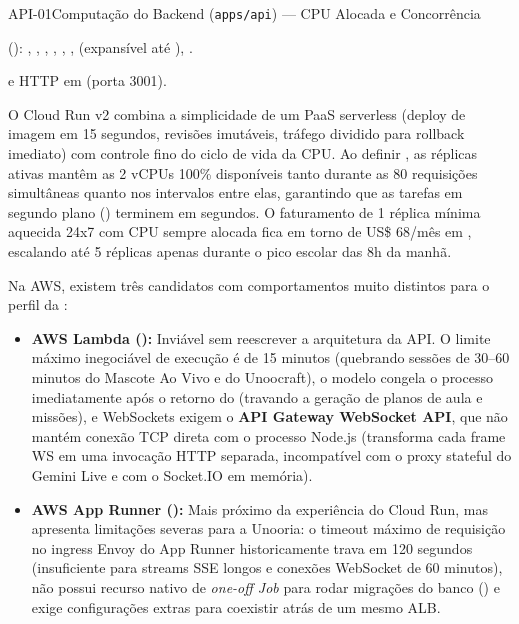 \begin{pecaarq}{API-01}{Computação do Backend (\texttt{apps/api}) --- CPU Alocada e Concorrência}{\sgcp~\nativo\enspace\saws~\equivalente\enspace\sazure~\nativo}
\begin{campos}
  \item[Configuração GCP]  (): , , , , , ,  (expansível até ), .
  \item[Sondas de saúde]  e  HTTP em  (porta 3001).
  \item[Como é hoje (GCP)] O Cloud Run v2 combina a simplicidade de um PaaS serverless (deploy de imagem em 15 segundos, revisões imutáveis, tráfego dividido para rollback imediato) com controle fino do ciclo de vida da CPU. Ao definir , as réplicas ativas mantêm as 2 vCPUs 100\% disponíveis tanto durante as 80 requisições simultâneas quanto nos intervalos entre elas, garantindo que as tarefas em segundo plano () terminem em segundos. O faturamento de 1 réplica mínima aquecida 24x7 com CPU sempre alocada fica em torno de US\$ 68/mês em , escalando até 5 réplicas apenas durante o pico escolar das 8h da manhã.
  \item[Alternativas AWS] Na AWS, existem três candidatos com comportamentos muito distintos para o perfil da :
  \begin{itemize}
    \item \textbf{AWS Lambda (\incompativel):} Inviável sem reescrever a arquitetura da API. O limite máximo inegociável de execução é de 15 minutos (quebrando sessões de 30--60 minutos do Mascote Ao Vivo e do Unoocraft), o modelo congela o processo imediatamente após o retorno do  (travando a geração de planos de aula e missões), e WebSockets exigem o \textbf{API Gateway WebSocket API}, que não mantém conexão TCP direta com o processo Node.js (transforma cada frame WS em uma invocação HTTP separada, incompatível com o proxy stateful do Gemini Live e com o Socket.IO em memória).
    \item \textbf{AWS App Runner (\adaptacao):} Mais próximo da experiência do Cloud Run, mas apresenta limitações severas para a Unooria: o timeout máximo de requisição no ingress Envoy do App Runner historicamente trava em 120 segundos (insuficiente para streams SSE longos e conexões WebSocket de 60 minutos), não possui recurso nativo de \emph{one-off Job} para rodar migrações do banco () e exige configurações extras para coexistir atrás de um mesmo ALB.

\end{itemize}
\end{campos}
\end{pecaarq}
